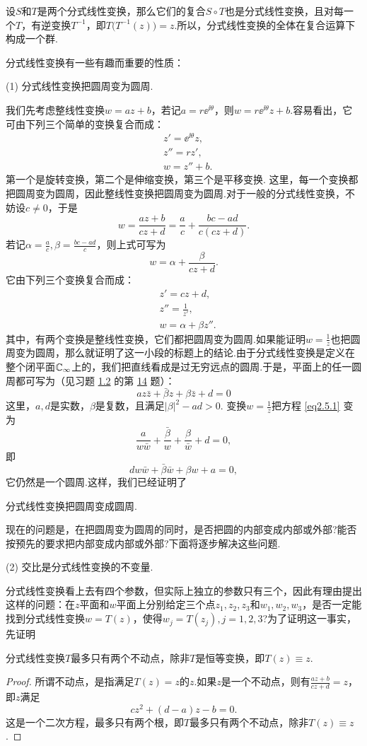 设$S$和$T$是两个分式线性变换，那么它们的复合$S\circ T$也是分式线性变换，且对每一个$T$，有逆变换$T^{-1}$，即$T\big(T^{-1}(z)\big)=z$.所以，分式线性变换的全体在复合运算下构成一个群.

分式线性变换有一些有趣而重要的性质：

(1) {\kaishu 分式线性变换把圆周变为圆周.}

我们先考虑整线性变换$w=az+b$，若记$a=r\ee^{\ii\theta}$，则$w=r\ee^{\ii\theta}z+b$.容易看出，它可由下列三个简单的变换复合而成：
\begin{align*}
  & z' = \ee^{\ii\theta}z,\\
  & z'' = rz',\\
  & w = z''+b.
\end{align*}
第一个是旋转变换，第二个是伸缩变换，第三个是平移变换. 这里，每一个变换都把圆周变为圆周，因此整线性变换把圆周变为圆周.对于一般的分式线性变换，不妨设$c\ne0$，于是
\[
  w = \frac{az+b}{cz+d} = \frac ac + \frac{bc-ad}{c(cz+d)}.
\]
若记$\alpha=\frac ac,\beta=\frac{bc-ad}c$，则上式可写为
\[
  w = \alpha + \frac{\beta}{cz+d}.
\]
它由下列三个变换复合而成：
\begin{align*}
  & z' = cz+d,\\
  & z'' = \frac1{z'},\\
  & w = \alpha + \beta z''.
\end{align*}
其中，有两个变换是整线性变换，它们都把圆周变为圆周.如果能证明$w=\frac 1z$也把圆周变为圆周，那么就证明了这一小段的标题上的结论.由于分式线性变换是定义在整个闭平面$\mathbb C_\infty$上的，我们把直线看成是过无穷远点的圆周.于是，平面上的任一圆周都可写为（见习题 \hyperlink{xiti1.2}{1.2} 的第 \hyperlink{xiti1.2.14}{14} 题）：
\begin{equation}\label{eq2.5.1}
  az\bar z + \bar \beta z + \beta \bar z + d = 0
\end{equation}
这里，$a,d$是实数，$\beta$是复数，且满足$|\beta|^2-ad>0$. 变换$w=\frac1z$把方程 \eqref{eq2.5.1} 变为
\[
  \frac a{w\bar w} + \frac{\bar \beta}w + \frac{\beta}{\bar w} + d = 0,
\]
即
\[
 dw \bar w + \bar\beta \bar w + \beta w + a = 0,
\]
它仍然是一个圆周.这样，我们已经证明了
\begin{theorem}\label{thm2.5.1}
  分式线性变换把圆周变成圆周.
\end{theorem}

现在的问题是，在把圆周变为圆周的同时，是否把圆的内部变成内部或外部?能否按预先的要求把内部变成内部或外部?下面将逐步解决这些问题.

(2) {\kaishu 交比是分式线性变换的不变量.}

分式线性变换看上去有四个参数，但实际上独立的参数只有三个，因此有理由提出这样的问题：在$z$平面和$w$平面上分别给定三个点$z_1,z_2,z_3$和$w_1,w_2,w_3$，是否一定能找到分式线性变换$w=T(z)$，使得$w_j=T(z_j),j=1,2,3$?为了证明这一事实，先证明
\begin{prop}\label{prop2.5.2}
  分式线性变换$T$最多只有两个不动点，除非$T$是恒等变换，即$T(z)\equiv z$.
\end{prop}
\begin{proof}
  所谓不动点，是指满足$T(z)=z$的$z$.如果$z$是一个不动点，则有$\frac{az+b}{cz+d}=z$，即$z$满足
  \[
    cz^2 + (d - a)z - b = 0.
  \]
  这是一个二次方程，最多只有两个根，即$T$最多只有两个不动点，除非$T(z)\equiv z$.
\end{proof}

